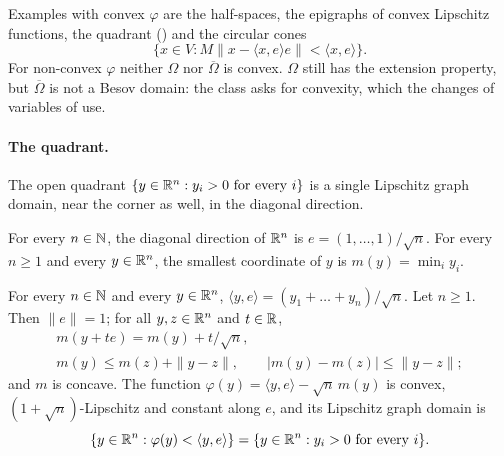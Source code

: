 Examples with convex $\varphi$ are the half-spaces, the epigraphs of convex Lipschitz functions,
the quadrant () and the circular cones
\[
  \{x \in V : M \|x - \langle x, e \rangle e\| < \langle x, e \rangle\} .
\]
For non-convex $\varphi$ neither $\Omega$ nor $\overline{\Omega}$ is convex. $\Omega$ still has the
extension property, but $\overline{\Omega}$ is not a Besov domain: the class asks for convexity,
which the changes of variables of  use.

\paragraph{The quadrant.}
The open quadrant $\{y \in \mathbb{R}^n : y_i > 0 \text{ for every } i\}$ is a single Lipschitz graph
domain, near the corner as well, in the diagonal direction.

\begin{definition}
\label{def:quadrant-graph}
\leanok
For every $n \in \mathbb{N}$, the diagonal direction of $\mathbb{R}^n$ is $e = (1, \dots, 1)/\sqrt{n}$. For every
$n \geq 1$ and every $y \in \mathbb{R}^n$, the smallest coordinate of $y$ is $m(y) = \min_i y_i$.
\end{definition}

\begin{lemma}
\label{lem:quadrant-graph}
\leanok
{}
For every $n \in \mathbb{N}$ and every $y \in \mathbb{R}^n$, $\langle y, e \rangle = (y_1 + \dots + y_n)/\sqrt{n}$.
Let $n \geq 1$. Then $\|e\| = 1$; for all $y, z \in \mathbb{R}^n$ and $t \in \mathbb{R}$,
\begin{gather*}
  m(y + t e) = m(y) + t/\sqrt{n} , \\
  m(y) \leq m(z) + \|y - z\| , \qquad |m(y) - m(z)| \leq \|y - z\| ;
\end{gather*}
and $m$ is concave. The function $\varphi(y) = \langle y, e \rangle - \sqrt{n}\, m(y)$ is convex,
$(1 + \sqrt{n})$-Lipschitz and constant along $e$, and its Lipschitz graph domain is
\[
  \{y \in \mathbb{R}^n : \varphi(y) < \langle y, e \rangle\} = \{y \in \mathbb{R}^n : y_i > 0 \text{ for every }
  i\} .
\]
\end{lemma}

